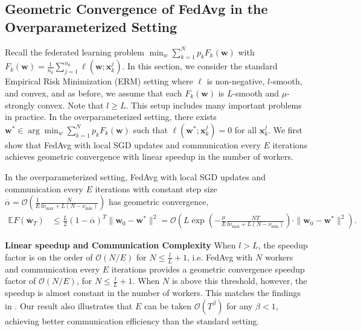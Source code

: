 \subsection{Geometric Convergence of FedAvg in the Overparameterized Setting}
Recall the federated learning problem $\min_{w}\sum_{k=1}^{N}p_{k}F_{k}(\mathbf{w})$
with $F_{k}(\mathbf{w})=\frac{1}{n_{k}}\sum_{j=1}^{n_{k}}\ell(\mathbf{w};\mathbf{x}_{k}^{j})$.
In this section, we consider the standard Empirical Risk Minimization (ERM) setting where $\ell$
is non-negative, $l$-smooth, and convex, and as before, we assume
that each $F_{k}(\mathbf{w})$ is $L$-smooth and $\mu$-strongly convex. Note that $l\geq L$. This
setup includes many important problems in practice. In the overparameterized
setting, there exists $\mathbf{w}^{\ast}\in\arg\min_{w}\sum_{k=1}^{N}p_{k}F_{k}(\mathbf{w})$
such that $\ell(\mathbf{w}^{\ast};\mathbf{x}_{k}^{j})=0$ for all
$\mathbf{x}_{k}^{j}$. We first show that FedAvg with local SGD updates
and communication every $E$ iterations achieves geometric convergence
with linear speedup in the number of workers. 
\begin{theorem}
	\label{thm:overparameterized_general}In the overparameterized setting,
	FedAvg with local SGD updates and communication every $E$ iterations
	with constant step size $\overline{\alpha}=\mathcal{O}(\frac{1}{E}\frac{N}{l\nu_{\max}+L(N-\nu_{\min})})$
	has geometric convergence,
	\begin{align*}
	\mathbb{E}F(\overline{\mathbf{w}}_{T}) & \leq\frac{L}{2}(1-\overline{\alpha})^{T}\|\mathbf{w}_{0}-\mathbf{w}^{\ast}\|^{2}=\mathcal{O}\left(L\exp(-\frac{\mu}{E}\frac{NT}{l\nu_{\max}+L(N-\nu_{\min})})\cdot\|\mathbf{w}_{0}-\mathbf{w}^{\ast}\|^{2}\right).
	\end{align*}
\end{theorem}
%
\textbf{Linear speedup and Communication Complexity} When $l>L$,
the speedup factor is on the order of $\mathcal{O}(N/E)$ %
for $N\leq\frac{l}{L}+1$, i.e. FedAvg with $N$ workers and communication
every $E$ iterations provides a geometric convergence speedup factor
of $\mathcal{O}(N/E)$, for $N\leq\frac{l}{L}+1$. When $N$ is above
this threshold, however, the speedup is almost constant in the number
of workers. This matches the findings in \cite{ma2017power}. Our
result also illustrates that $E$ can be taken $\mathcal{O}(T^{\beta})$
for any $\beta<1$, achieving better communication efficiency than
the standard setting. 

